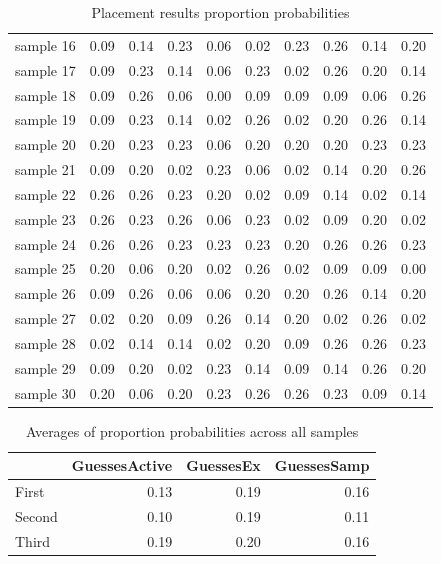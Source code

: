 \begin{table}
\begin{tabular}{|l|rrr|rrr|rrr|}
sample 16 &          0.09 &  0.14 &  0.23 &      0.06 &  0.02 &  0.23 &        0.26 &  0.14 &  0.20 \\
sample 17 &          0.09 &  0.23 &  0.14 &      0.06 &  0.23 &  0.02 &        0.26 &  0.20 &  0.14 \\
sample 18 &          0.09 &  0.26 &  0.06 &      0.00 &  0.09 &  0.09 &        0.09 &  0.06 &  0.26 \\
sample 19 &          0.09 &  0.23 &  0.14 &      0.02 &  0.26 &  0.02 &        0.20 &  0.26 &  0.14 \\
sample 20 &          0.20 &  0.23 &  0.23 &      0.06 &  0.20 &  0.20 &        0.20 &  0.23 &  0.23 \\
sample 21 &          0.09 &  0.20 &  0.02 &      0.23 &  0.06 &  0.02 &        0.14 &  0.20 &  0.26 \\
sample 22 &          0.26 &  0.26 &  0.23 &      0.20 &  0.02 &  0.09 &        0.14 &  0.02 &  0.14 \\
sample 23 &          0.26 &  0.23 &  0.26 &      0.06 &  0.23 &  0.02 &        0.09 &  0.20 &  0.02 \\
sample 24 &          0.26 &  0.26 &  0.23 &      0.23 &  0.23 &  0.20 &        0.26 &  0.26 &  0.23 \\
sample 25 &          0.20 &  0.06 &  0.20 &      0.02 &  0.26 &  0.02 &        0.09 &  0.09 &  0.00 \\
sample 26 &          0.09 &  0.26 &  0.06 &      0.06 &  0.20 &  0.20 &        0.26 &  0.14 &  0.20 \\
sample 27 &          0.02 &  0.20 &  0.09 &      0.26 &  0.14 &  0.20 &        0.02 &  0.26 &  0.02 \\
sample 28 &          0.02 &  0.14 &  0.14 &      0.02 &  0.20 &  0.09 &        0.26 &  0.26 &  0.23 \\
sample 29 &          0.09 &  0.20 &  0.02 &      0.23 &  0.14 &  0.09 &        0.14 &  0.26 &  0.20 \\
sample 30 &          0.20 &  0.06 &  0.20 &      0.23 &  0.26 &  0.26 &        0.23 &  0.09 &  0.14 \\
\bottomrule
\end{tabular}
\caption{Placement results proportion probabilities}
\end{table}


\begin{table}
\begin{tabular}{lrrr}
\toprule
{} &  GuessesActive &  GuessesEx &  GuessesSamp \\
\midrule
First  &        0.13 &       0.19 &         0.16 \\
Second &        0.10 &       0.19 &         0.11 \\
Third  &        0.19 &       0.20 &         0.16 \\
\bottomrule
\end{tabular}
\caption{Averages of proportion probabilities across all samples}
\end{table}

